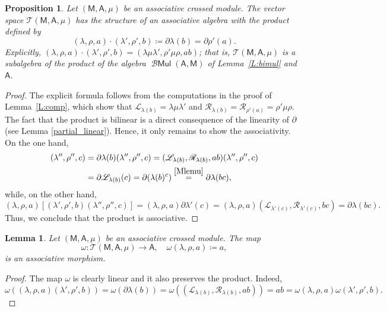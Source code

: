 \documentclass[12pt,reqno]{amsart}
\theoremstyle{plain}
\newtheorem{proposition}[theorem]{Proposition}
\newtheorem{lemma}[theorem]{Lemma}
\theoremstyle{definition}
\theoremstyle{remark}
\def\lam{\lambda}
\newcommand{\A}{\ensuremath{\mathsf{A}}}
\newcommand{\MM}{\ensuremath{\mathsf{M}}}
\newcommand{\T}{\ensuremath{\mathcal{T}}}
\newcommand{\LL}{\ensuremath{\mathcal{L}}}
\newcommand{\RR}{\ensuremath{\mathcal{R}}}
\DeclareMathOperator{\Mul}{\mathcal{B}\ensuremath{\mathsf{Mul}}}
\numberwithin{equation}{section}
\begin{document}
\begin{proposition}\label{prop:algebra}
	Let $(\MM,\A,\mu)$	be an  associative crossed module. The vector space $\T(\MM,\A,\mu)$ has the structure of an associative algebra with the product defined by
	\begin{equation}\label{eq:prod}
		 (\lam,\rho,a) \cdot (\lam',\rho',b)  \coloneqq \partial \lam(b)=\partial \rho'(a).
	\end{equation}
	 Explicitly, $(\lam,\rho,a) \cdot (\lam',\rho',b)=(\lam \mu \lam',  \rho' \mu \rho, ab)$; that is, $\T(\MM,\A,\mu)$ is a subalgebra of the product of the algebra $\Mul(\A, \MM)$ of Lemma~\ref{L:bimul} and $\A$.
\end{proposition}
\begin{proof}
	The explicit formula follows from the computations in the proof of Lemma~\ref{L:comp}, which show that $\LL_{\lam(b)}=\lam\mu\lam'$ and $\RR_{\lam(b)}=\RR_{\rho'(a)}=\rho'\mu\rho$. The fact that the product is bilinear is a direct consequence of the linearity of $\partial$ (see Lemma \ref{partial_linear}). Hence, it only remains to show the associativity. On the one hand,
	\begin{align*}
		[(\lam,\rho,a)(\lam',\rho',b)](\lam'',\rho'',c) & = \partial\lam(b)(\lam'',\rho'',c)=(\LL_{\lam(b)},\RR_{\lam(b)}, ab)(\lam'',\rho'',c)\\
		& = \partial\LL_{\lambda(b)}(c)=\partial(\lambda(b)^{c})\stackrel{\eqref{Mlemu}}{=}\partial\lambda(bc),
	\end{align*}
	while, on the other hand,
	\[(\lam,\rho,a)[(\lam',\rho',b)(\lam'',\rho'',c)]=(\lam,\rho,a)\partial\lambda'(c)=(\lam,\rho,a)(\LL_{\lam'(c)},\RR_{\lam'(c)}, bc)=\partial\lambda(bc).\]
	Thus, we conclude that the product is associative.
\end{proof}

\begin{lemma}\label{L:omega_mor}
	Let $(\MM,\A,\mu)$	be an  associative crossed module. The map 
	\[\omega \colon \T(\MM,\A,\mu) \xrightarrow{\quad} \A, \quad   \omega(\lam,\rho,a) \coloneqq a,\]
is an  associative morphism.
\end{lemma}	
\begin{proof}
	The map $\omega$ is clearly linear and it also preserves the product. Indeed,
	\[
		\omega((\lambda,\rho,a)(\lambda',\rho',b))=\omega(\partial\lambda(b))=\omega((\LL_{\lam(b)},\RR_{\lam(b)}, ab))=ab=\omega(\lambda,\rho,a)\omega(\lambda',\rho',b).
	\]
\end{proof}
\end{document}
